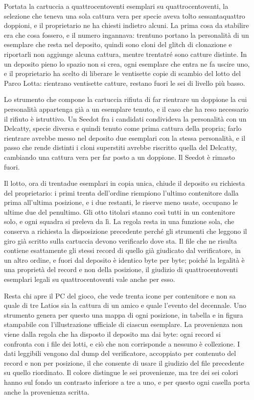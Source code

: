 Portata la cartuccia a quattrocentoventi esemplari su quattrocentoventi, la selezione che teneva una sola cattura vera per specie aveva tolto sessantaquattro doppioni, e il proprietario ne ha chiesti indietro alcuni. La prima cosa da stabilire era che cosa fossero, e il numero ingannava: trentuno portano la personalità di un esemplare che resta nel deposito, quindi sono cloni del glitch di clonazione e riportarli non aggiunge alcuna cattura, mentre trentatré sono catture distinte. In un deposito pieno lo spazio non si crea, ogni esemplare che entra ne fa uscire uno, e il proprietario ha scelto di liberare le ventisette copie di scambio del lotto del Parco Lotta: rientrano ventisette catture, restano fuori le sei di livello più basso.

Lo strumento che compone la cartuccia rifiuta di far rientrare un doppione la cui personalità appartenga già a un esemplare tenuto, e il caso che ha reso necessario il rifiuto è istruttivo. Un Seedot fra i candidati condivideva la personalità con un Delcatty, specie diversa e quindi tenuto come prima cattura della propria; farlo rientrare avrebbe messo nel deposito due esemplari con la stessa personalità, e il passo che rende distinti i cloni superstiti avrebbe riscritto quella del Delcatty, cambiando una cattura vera per far posto a un doppione. Il Seedot è rimasto fuori.

Il lotto, ora di trentadue esemplari in copia unica, chiude il deposito su richiesta del proprietario: i primi trenta dell'ordine riempiono l'ultimo contenitore dalla prima all'ultima posizione, e i due restanti, le riserve meno usate, occupano le ultime due del penultimo. Gli otto titolari stanno così tutti in un contenitore solo, e ogni squadra si preleva da lì. La regola resta in una funzione sola, che conserva a richiesta la disposizione precedente perché gli strumenti che leggono il giro già scritto sulla cartuccia devono verificarlo dove sta. Il file che ne risulta contiene esattamente gli stessi record di quello già giudicato dal verificatore, in un altro ordine, e fuori dal deposito è identico byte per byte; poiché la legalità è una proprietà del record e non della posizione, il giudizio di quattrocentoventi esemplari legali su quattrocentoventi vale anche per esso.

Resta chi apre il PC del gioco, che vede trenta icone per contenitore e non sa quale di tre Latios sia la cattura di un amico e quale l'evento del decennale. Uno strumento genera per questo una mappa di ogni posizione, in tabella e in figura stampabile con l'illustrazione ufficiale di ciascun esemplare. La provenienza non viene dalla regola che ha disposto il deposito ma dai byte: ogni record si confronta con i file dei lotti, e ciò che non corrisponde a nessuno è collezione. I dati leggibili vengono dal dump del verificatore, accoppiato per contenuto del record e non per posizione, il che consente di usare il giudizio del file precedente su quello riordinato. Il colore distingue le sei provenienze, ma tre dei sei colori hanno sul fondo un contrasto inferiore a tre a uno, e per questo ogni casella porta anche la provenienza scritta.


